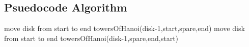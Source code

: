 \documentclass{article}
\begin{document}
\subsection{Psuedocode Algorithm}	

\begin{algorithmic}
		\State move disk from start to end
	\Else
		\State towersOfHanoi(disk-1,start,spare,end)
		\State move disk from start to end
		\State towersOfHanoi(disk-1,spare,end,start)
	\EndIf
\EndFunction
\end{algorithmic}
\end{document}
